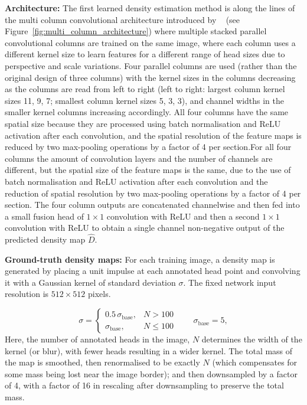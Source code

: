 \textbf{Architecture:} The first learned density estimation method is along the lines of the multi column convolutional architecture introduced by ~\cite{Zhu2020} (see Figure~\ref{fig:multi_column_architecture}) where multiple stacked parallel convolutional columns are trained on the same image, where each column uses a different kernel size to learn features for a different range of head sizes due to perspective and scale variations. Four parallel columns are used (rather than the original design of three columns) with the kernel sizes in the columns decreasing as the columns are read from left to right (left to right: largest column kernel sizes 11, 9, 7; smallest column kernel sizes 5, 3, 3), and channel widths in the smaller kernel columns increasing accordingly. All four columns have the same spatial size because they are processed using batch normalisation and ReLU activation after each convolution, and the spatial resolution of the feature maps is reduced by two max-pooling operations by a factor of 4 per section.For all four columns the amount of convolution layers and the number of channels are different, but the spatial size of the feature maps is the same, due to the use of batch normalisation and ReLU activation after each convolution and the reduction of spatial resolution by two max-pooling operations by a factor of 4 per section. The four column outputs are concatenated channelwise and then fed into a small fusion head of $1{\times}1$ convolution with ReLU and then a second $1{\times}1$ convolution with ReLU to obtain a single channel non-negative output of the predicted density map $\hat D$.

\textbf{Ground-truth density maps:} For each training image, a density map is generated by placing a unit impulse at each annotated head point and convolving it with a Gaussian kernel of standard deviation $\sigma$. The fixed network input resolution is $512\times512$ pixels.

\begin{equation}
	\sigma =
	\begin{cases}
		0.5\,\sigma_{\text{base}}, & N > 100 \\
		\sigma_{\text{base}}, & N \le 100
	\end{cases}
	\qquad \sigma_{\text{base}} = 5,
\end{equation}
Here, the number of annotated heads in the image, $N$ determines the width of the kernel (or blur), with fewer heads resulting in a wider kernel. The total mass of the map is smoothed, then renormalised to be exactly $N$ (which compensates for some mass being lost near the image border); and then downsampled by a factor of 4, with a factor of 16 in rescaling after downsampling to preserve the total mass.

